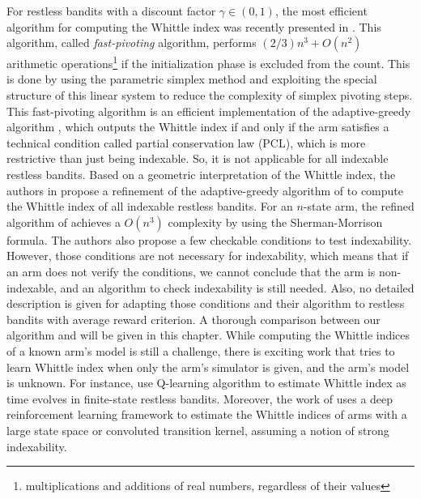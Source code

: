 For restless bandits with a discount factor $\gamma\in(0,1)$, the most efficient algorithm for computing the Whittle index was recently presented in \cite{nino2020fast}.
This algorithm, called \emph{fast-pivoting} algorithm, performs $(2/3)n^3+O(n^2)$ arithmetic operations\footnote{multiplications and additions of real numbers, regardless of their values} if the initialization phase is excluded from the count.
This is done by using the parametric simplex method and  exploiting the special structure of this linear system to reduce the complexity of simplex pivoting steps.
This fast-pivoting algorithm is an efficient implementation of the adaptive-greedy algorithm \cite{nino2007dynamic}, which outputs the Whittle index if and only if the arm satisfies a technical condition called partial conservation law (PCL), which is more restrictive than just being indexable.
So, it is not applicable for all indexable restless bandits.
Based on a geometric interpretation of the Whittle index, the authors in \cite{akbarzadeh2020conditions} propose a refinement of the adaptive-greedy algorithm of \cite{nino2007dynamic} to compute the Whittle index of all indexable restless bandits.
For an $n$-state arm, the refined algorithm of \cite{akbarzadeh2020conditions} achieves a $O(n^3)$ complexity by using the Sherman-Morrison formula.
The authors also propose a few checkable conditions to test indexability.
However, those conditions are not necessary for indexability, which means that if an arm does not verify the conditions, we cannot conclude that the arm is non-indexable, and an algorithm to check indexability is still needed.
Also, no detailed description is given for adapting those conditions and their algorithm to restless bandits with average reward criterion.
A thorough comparison between our algorithm and \cite{akbarzadeh2020conditions,nino2020fast} will be given in this chapter. 
While computing the Whittle indices of a known arm's model is still a challenge, there is exciting work that tries to learn Whittle index when only the arm's simulator is given, and the arm's model is unknown.
For instance, \cite{gibson2021novel, avrachenkov2022whittle, fu2019towards} use Q-learning algorithm to estimate Whittle index as time evolves in finite-state restless bandits. Moreover,
the work of \cite{nakhleh2021neurwin} uses a deep reinforcement learning framework to estimate the Whittle indices of arms with a large state space or convoluted transition kernel, assuming a notion of strong indexability. 

